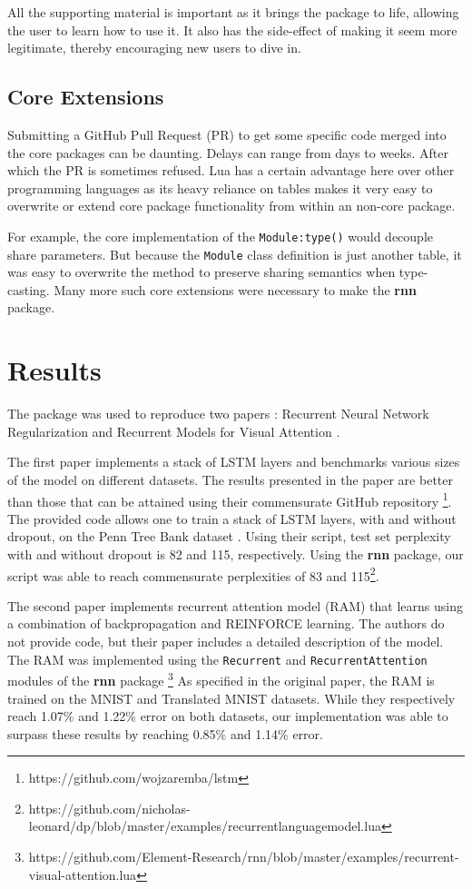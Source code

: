 \documentclass{article} %
\providecommand{\inlinecode}[1]{\texttt{#1}}
\begin{document}
All the supporting material is important as it brings the package to life, 
allowing the user to learn how to use it. It also has the side-effect of 
making it seem more legitimate, thereby encouraging new users to dive in.

\subsection{Core Extensions}

Submitting a GitHub Pull Request (PR) to get some specific code merged into the core packages 
can be daunting. Delays can range from days to weeks. After which the PR is sometimes refused.
Lua has a certain advantage here over other programming languages as its heavy reliance on
tables makes it very easy to overwrite or extend core package functionality from within an non-core package.

For example, the core implementation of the \inlinecode{Module:type()} would 
decouple share parameters. But because the \inlinecode{Module} class definition 
is just another table, it was easy to overwrite the method to 
preserve sharing semantics when type-casting. Many more such core extensions were 
necessary to make the \textbf{rnn} package.

\section{Results}

The package was used to reproduce two papers :
Recurrent Neural Network Regularization \cite{zaremba2014recurrent}
and Recurrent Models for Visual Attention \cite{mnih2014recurrent}.

The first paper implements a stack of LSTM layers \cite{hinton2012improving}
and benchmarks various sizes of the model on different datasets.
The results presented in the paper are better than 
those that can be attained using their commensurate GitHub repository 
\footnote{https://github.com/wojzaremba/lstm}. 
The provided code allows one to train a stack of LSTM layers, 
with and without dropout, 
on the Penn Tree Bank dataset \cite{marcus1993building}.
Using their script, test set perplexity
with and without dropout is 82 and 115, respectively.
Using the \textbf{rnn} package, our script was able to reach 
commensurate perplexities of 83 and 115\footnote{https://github.com/nicholas-leonard/dp/blob/master/examples/recurrentlanguagemodel.lua}.

The second paper implements recurrent attention model (RAM) that 
learns using a combination of backpropagation and REINFORCE\cite{williams1992simple} learning.
The authors do not provide code, but their paper includes a detailed 
description of the model.
The RAM was implemented using the \inlinecode{Recurrent} and \inlinecode{RecurrentAttention}
modules of the \textbf{rnn} package 
\footnote{https://github.com/Element-Research/rnn/blob/master/examples/recurrent-visual-attention.lua}
As specified in the original paper, the RAM is trained on the MNIST \cite{lecun1998mnist} and Translated MNIST datasets.
While they respectively reach 1.07\% and 1.22\% error on both datasets, 
our implementation was able to surpass these results by reaching 0.85\% and 1.14\% error.
\end{document}
